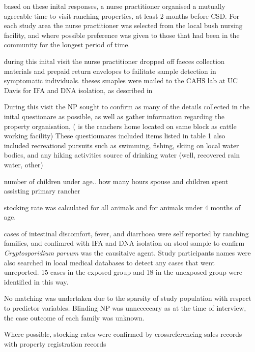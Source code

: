 \documentclass[12pt]{article}
\begin{document}
		based on these inital responses, a nurse practitioner organised a mutually agreeable time to visit ranching properties, at least 2 months before CSD.	%
		For each study area the nurse practitioner was selected from the local bush nursing facility, and where possible preference was given to those that had been in the community for the longest period of time.

	during this inital visit the nurse practitioner dropped off faeces collection materials and prepaid return envelopes to failitate sample detection in symptomatic individuals.		%
		theses smaples were mailed to the CAHS lab at UC Davis for IFA and DNA isolation,  as described in \cite{Atwill1999}

		During this visit the NP sought to confirm as many of the details collected in the inital questionare as possible, as well as gather information regarding the property organisation, ( is the ranchers home located on same block as cattle working facility)
		These questiounares included items listed in table 1
		also included recreationsl pursuits such as swimming, fishing, skiing on local water bodies, and any hiking activities 
		source of drinking water (well, recovered rain water, other)

		number of children under age..
		how many hours spouse and children spent assisting primary rancher 
		
		stocking rate was calculated for all animals and for animals under 4 months of age.	%

		cases of intestinal discomfort, fever, and diarrhoea were self reported by ranching families, and confimred with IFA and DNA isolation on stool sample to confirm \emph{Cryptosporidium parvum} was the causitaive agent.
		Study participants names were also searched in local medical databases to detect any cases that went unreported. 15 cases in the exposed group and 18 in the unexposed group were identified in this way. 
		
		No matching was undertaken due to the sparsity of study population with respect to predictor variables. Blinding NP was unneccecary as at the time of interview, the case outcome of each family was unknown.


		Where possible, stocking rates were confirmed by crossreferencing sales records with property registration records
		
\end{document}
